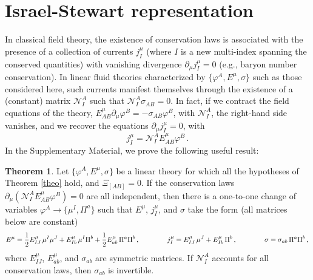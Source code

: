 \documentclass[aps,prl,singlecolumn,nofootinbib]{revtex4-2}
\theoremstyle{definition}
\theoremstyle{theorem}
\newtheorem{theorem}{Theorem}
\begin{document}
\section{Israel-Stewart representation}
In classical field theory, the existence of conservation laws is associated with the presence of a collection of currents $j_I^\mu$ (where $I$ is a new multi-index spanning the conserved quantities) with vanishing divergence $\partial_\mu j_I^\mu=0$ \cite{Peskin_book} (e.g., baryon number conservation). In linear fluid theories characterized by $\{\varphi^A,E^\mu,\sigma\}$ such as those considered here, such currents manifest themselves through the existence of a (constant) matrix $\mathcal{N}^A_I$ such that $\mathcal{N}^A_I \sigma_{AB}=0$.
In fact, if we contract the field equations of the theory, $E^\mu_{AB}\partial_\mu \varphi^B=-\sigma_{AB}\varphi^B$, with $\mathcal{N}^A_I$, the right-hand side vanishes, and we recover the equations $\partial_\mu j_I^\mu=0$, with
\begin{equation}\label{martina}
    j_I^\mu = \mathcal{N}^A_I E^\mu_{AB} \varphi^B \, .
\end{equation}
In the Supplementary Material, we prove the following useful result:
\begin{theorem}\label{theoLind}
Let $\{\varphi^A,E^\mu,\sigma \}$ be a linear theory for which all the hypotheses of Theorem \ref{theo} hold, and $\Xi_{[AB]}=0$. If the  conservation laws $\partial_\mu ( \mathcal{N}^A_I E^\mu_{AB} \varphi^B)=0$ are all independent, then there is a one-to-one change of variables $\varphi^A \rightarrow \{ \mu^I,\Pi^a \}$ such that $E^\mu$, $j_I^\mu$, and $\sigma$ take the form (all matrices below are constant)
\begin{equation}\label{decompose}
    E^\mu = \dfrac{1}{2} E^\mu_{IJ} \, \mu^I \mu^J + E^\mu_{Ib} \, \mu^I \Pi^b +\dfrac{1}{2} E^\mu_{ab} \, \Pi^a \Pi^b \, ,\qquad \qquad 
    j^\mu_I =  E^\mu_{IJ} \,  \mu^J + E^\mu_{Ib} \, \Pi^b  \, , \qquad \qquad
    \sigma = \sigma_{ab} \, \Pi^a \Pi^b \, ,  \\
\end{equation}
where $E^\mu_{IJ}$, $E^\mu_{ab}$, and $\sigma_{ab}$ are symmetric matrices. If $\mathcal{N}^A_I$ accounts for all conservation laws, then $\sigma_{ab}$ is invertible. 
\end{theorem}
\end{document}
